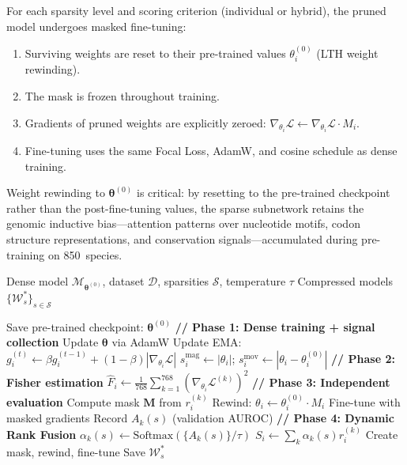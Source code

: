 \documentclass[journal]{IEEEtran}
\begin{document}
For each sparsity level and scoring criterion (individual or
hybrid), the pruned model undergoes masked fine-tuning:

\begin{enumerate}
  \item Surviving weights are reset to their pre-trained values
        $\theta_i^{(0)}$ (LTH weight rewinding).
  \item The mask is frozen throughout training.
  \item Gradients of pruned weights are explicitly zeroed:
        $\nabla_{\theta_i}\mathcal{L} \leftarrow
         \nabla_{\theta_i}\mathcal{L} \cdot M_i$.
  \item Fine-tuning uses the same Focal Loss, AdamW, and
        cosine schedule as dense training.
\end{enumerate}

Weight rewinding to $\bm{\theta}^{(0)}$ is critical: by
resetting to the pre-trained checkpoint rather than the
post-fine-tuning values, the sparse subnetwork retains the
genomic inductive bias---attention patterns over nucleotide
motifs, codon structure representations, and conservation
signals---accumulated during pre-training on 850~species.


\begin{algorithm}[!t]
\caption{LTH Compression Pipeline}
\label{alg:pipeline}
\begin{algorithmic}[1]
\Require Dense model $\mathcal{M}_{\bm{\theta}^{(0)}}$,
         dataset $\mathcal{D}$, sparsities $\mathcal{S}$,
         temperature $\tau$
\Ensure Compressed models $\{\mathcal{W}_s^*\}_{s \in \mathcal{S}}$

\State Save pre-trained checkpoint: $\bm{\theta}^{(0)}$
\Statex \textbf{// Phase 1: Dense training + signal collection}
  \State Update $\bm{\theta}$ via AdamW
  \State Update EMA: $g_i^{(t)} \leftarrow \beta g_i^{(t-1)}
         + (1{-}\beta)|\nabla_{\theta_i}\mathcal{L}|$
\EndFor
\State $s_i^{\text{mag}} \leftarrow |\theta_i|$;\quad
       $s_i^{\text{mov}} \leftarrow |\theta_i - \theta_i^{(0)}|$
\Statex \textbf{// Phase 2: Fisher estimation}
\State $\hat{F}_i \leftarrow \frac{1}{768}\sum_{k=1}^{768}
       (\nabla_{\theta_i}\mathcal{L}^{(k)})^2$
\Statex \textbf{// Phase 3: Independent evaluation}
  \State Compute mask $\bm{M}$ from $r_i^{(k)}$
  \State Rewind: $\theta_i \leftarrow \theta_i^{(0)} \cdot M_i$
  \State Fine-tune with masked gradients
  \State Record $A_k(s)$ (validation AUROC)
\EndFor
\Statex \textbf{// Phase 4: Dynamic Rank Fusion}
  \State $\alpha_k(s) \leftarrow
         \text{Softmax}(\{A_k(s)\}/\tau)$
  \State $S_i \leftarrow \sum_k \alpha_k(s) r_i^{(k)}$
  \State Create mask, rewind, fine-tune
  \State Save $\mathcal{W}_s^*$
\EndFor
\end{algorithmic}
\end{algorithm}
\end{document}
